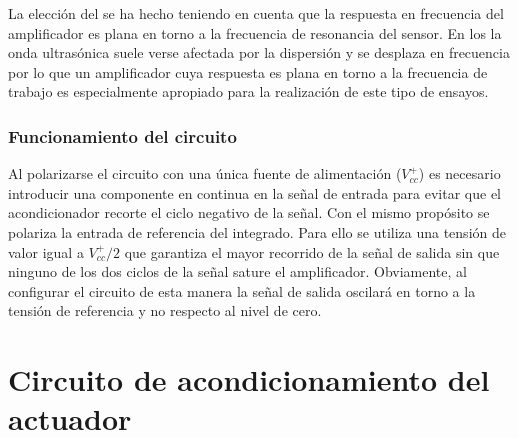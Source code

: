 La elección del  se ha hecho teniendo en cuenta que la
respuesta en frecuencia del amplificador es plana en torno a la frecuencia
de resonancia del sensor. En los  la onda ultrasónica suele
verse afectada por la dispersión y se desplaza en frecuencia por lo que un
amplificador cuya respuesta es plana en torno a la frecuencia de trabajo es
especialmente apropiado para la realización de este tipo de ensayos.


\subsubsection{Funcionamiento del circuito}

Al polarizarse el circuito con una única fuente de alimentación
($V^+_{cc}$) es necesario introducir una componente en continua en la señal
de entrada para evitar que el acondicionador recorte el ciclo negativo de
la señal. Con el mismo propósito se polariza la entrada de referencia del
integrado. Para ello se utiliza una tensión de valor igual a $V^+_{cc}/2$
que garantiza el mayor recorrido de la señal de salida sin que ninguno de
los dos ciclos de la señal sature el amplificador. Obviamente, al
configurar el circuito de esta manera la señal de salida oscilará en torno
a la tensión de referencia y no respecto al nivel de cero.


\section{Circuito de acondicionamiento del actuador}

\sshortpage{}

